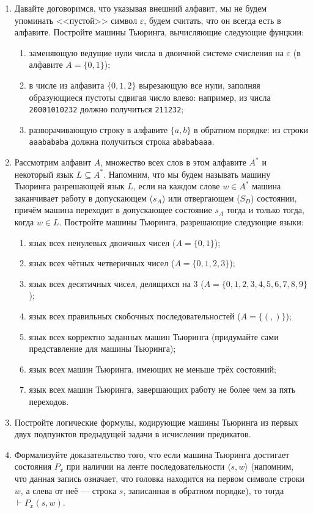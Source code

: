 \documentclass[10pt,a4paper,oneside]{article}
\begin{document}
\begin{enumerate}
\item Давайте договоримся, что указывая внешний алфавит, мы не будем упоминать 
<<пустой>> символ $\varepsilon$, будем считать, что он всегда есть в алфавите.
Постройте машины Тьюринга, вычисляющие следующие фунцкии:

\begin{enumerate}
\item заменяющую ведущие нули числа в двоичной системе счисления на $\varepsilon$ 
(в алфавите $A = \{0,1\}$);
\item в числе из алфавита $\{0,1,2\}$ вырезающую все нули, заполняя образующиеся пустоты 
сдвигая число влево: например, из числа \verb!20001010232! должно получиться \verb!211232!;
\item разворачивающую строку в алфавите $\{a,b\}$ в обратном порядке:
из строки \verb!aaabababa! должна получиться строка \verb!abababaaa!.
\end{enumerate}

\item Рассмотрим алфавит $A$, множество всех слов в этом алфавите $A^*$ и некоторый
язык $L \subseteq A^*$. Напомним, что мы будем называть машину Тьюринга разрешающей язык $L$,
если на каждом слове $w \in A^*$ машина заканчивает работу в допускающем ($s_A$) или 
отвергающем ($S_D$) состоянии, причём машина переходит в допускающее состояние $s_A$ тогда 
и только тогда, когда $w \in L$.
Постройте машины Тьюринга, разрешающие следующие языки:

\begin{enumerate}
\item язык всех ненулевых двоичных чисел ($A = \{0,1\}$);
\item язык всех чётных четверичных чисел ($A = \{0,1,2,3\}$);
\item язык всех десятичных чисел, делящихся на 3 ($A = \{0,1,2,3,4,5,6,7,8,9\}$);
\item язык всех правильных скобочных последовательностей ($A = \{(,)\}$);
\item язык всех корректно заданных машин Тьюринга (придумайте сами представление
для машины Тьюринга);
\item язык всех машин Тьюринга, имеющих не меньше трёх состояний;
\item язык всех машин Тьюринга, завершающих работу не более чем за пять переходов.
\end{enumerate}

\item Постройте логические формулы, кодирующие машины Тьюринга
из первых двух подпунктов предыдущей задачи в исчислении предикатов.

\item Формализуйте доказательство того, что если машина Тьюринга достигает
состояния $P_x$ при наличии на ленте последовательности $\langle s, w \rangle$
(напомним, что данная запись означает, что головка находится на первом 
символе строки $w$, а слева от неё --- строка $s$, записанная в обратном
порядке), то тогда $\vdash P_x(s,w)$.

\end{enumerate}
\end{document}
